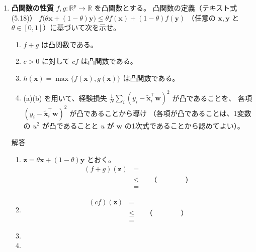 \documentclass[a4paper,dvipdfmx]{jsarticle}
\newcommand{\提出期限}{2026年10月26日（月）}
\newcommand{\学籍番号}{0000000}
\newcommand{\氏名}{氏名を書く}
\newcommand{\提出日}{2026年10月26日}
\newenvironment{answer}{\begin{itembox}[l]{解答}}{\end{itembox}}
\begin{document}
\begin{enumerate}
  \item \textbf{凸関数の性質}\quad
    $f, g : \mathbb{R}^p \to \mathbb{R}$ を凸関数とする。
    凸関数の定義（テキスト式(5.18)）
    $f\bigl(\theta\bm{x} + (1 - \theta)\bm{y}\bigr) \leq \theta f(\bm{x}) + (1 - \theta) f(\bm{y})$
    （任意の $\bm{x}, \bm{y}$ と $\theta \in [0, 1]$）に基づいて次を示せ。
    \begin{enumerate}
      \item $f + g$ は凸関数である。
      \item $c > 0$ に対して $cf$ は凸関数である。
      \item $h(\bm{x}) = \max\{f(\bm{x}), g(\bm{x})\}$ は凸関数である。
      \item (a)(b) を用いて、経験損失 $\frac{1}{N}\sum_i (y_i - \tilde{\bm{x}}_i^\top\bm{w})^2$ が凸であることを、
        各項 $(y_i - \tilde{\bm{x}}_i^\top\bm{w})^2$ が凸であることから導け
        （各項が凸であることは、1変数の $u^2$ が凸であることと $u$ が $\bm{w}$ の1次式であることから認めてよい）。
    \end{enumerate}
    \begin{answer}
      \begin{enumerate}
        \item $\bm{z} = \theta\bm{x} + (1 - \theta)\bm{y}$ とおく。
          \begin{align*}
            (f + g)(\bm{z}) &= \\
                            &\leq && \text{（　　　　）} \\
                            &=
          \end{align*}
        \item
          \begin{align*}
            (cf)(\bm{z}) &= \\
                         &\leq && \text{（　　　　）} \\
                         &=
          \end{align*}
        \item \mbox{}
          \vspace{24mm}
        \item \mbox{}
          \vspace{16mm}
      \end{enumerate}
    \end{answer}


\end{enumerate}
\end{document}

